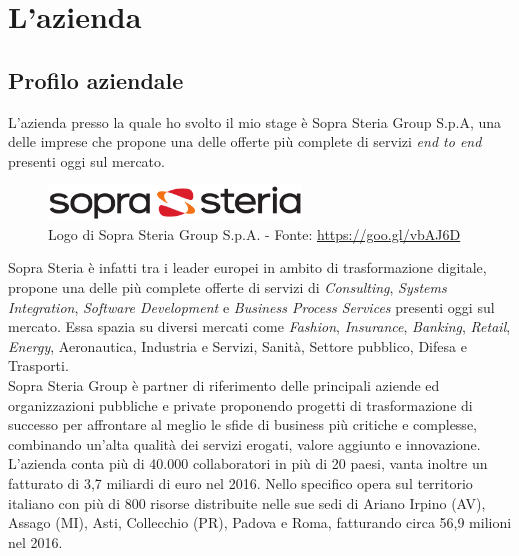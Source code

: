 

\chapter{L'azienda}

\section{Profilo aziendale}
L'azienda presso la quale ho svolto il mio stage è Sopra Steria Group S.p.A, una delle imprese che propone una delle offerte più complete di servizi \textit{end to end} presenti oggi sul mercato.\\

\begin{figure}[H]
	\centering
   	\includegraphics[width=0.6\textwidth]{immagini/logo_azienda}
   	\caption{Logo di Sopra Steria Group S.p.A. - Fonte: \url{https://goo.gl/vbAJ6D}}
\end{figure}

Sopra Steria è infatti tra i leader europei in ambito di trasformazione digitale, propone una delle più complete offerte di servizi di \textit{Consulting}, \textit{Systems Integration}, \textit{Software Development} e \textit{Business Process Services} presenti oggi sul mercato.
Essa spazia su diversi mercati come \textit{Fashion}, \textit{Insurance}, \textit{Banking}, \textit{Retail}, \textit{Energy}, Aeronautica, Industria e Servizi, Sanità, Settore pubblico, Difesa e Trasporti.\\

Sopra Steria Group è partner di riferimento delle principali aziende ed organizzazioni pubbliche e private proponendo progetti di trasformazione di successo per affrontare al meglio le sfide di business più critiche e complesse, combinando un'alta qualità dei servizi erogati, valore aggiunto e innovazione.\\

L'azienda conta più di 40.000 collaboratori in più di 20 paesi, vanta inoltre un fatturato di 3,7 miliardi di euro nel 2016. Nello specifico opera sul territorio italiano con più di 800 risorse distribuite nelle sue sedi di Ariano Irpino (AV), Assago (MI), Asti, Collecchio (PR), Padova e Roma, fatturando circa 56,9 milioni nel 2016.\\

